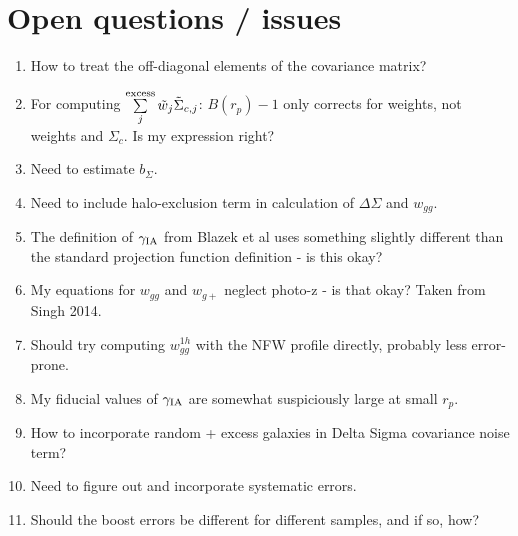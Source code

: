 \documentclass[onecolumn,amsmath,aps,fleqn, superscriptaddress]{revtex4}
\begin{document}
\section{Open questions / issues}
\begin{enumerate}
\item{How to treat the off-diagonal elements of the covariance matrix?}
\item{For computing $\sum\limits_{j}^{\rm excess} \tilde{w}_j \tilde{\Sigma}_{c,j}$: $B(r_p) - 1$ only corrects for weights, not weights and $\Sigma_c$. Is my expression right?}
\item{Need to estimate $b_{\Sigma}$.}
\item{Need to include halo-exclusion term in calculation of $\Delta \Sigma$ and $w_{gg}$.}
\item{The definition of $\gamma_{\rm IA}$ from Blazek et al uses something slightly different than the standard projection function definition - is this okay?}
\item{My equations for $w_{gg}$ and $w_{g+}$ neglect photo-z - is that okay? Taken from Singh 2014.}
\item{Should try computing $w_{gg}^{1h}$ with the NFW profile directly, probably less error-prone.}
\item{My fiducial values of $\gamma_{\rm IA}$ are somewhat suspiciously large at small $r_p$.}
\item{How to incorporate random + excess galaxies in Delta Sigma covariance noise term?}
\item{Need to figure out and incorporate systematic errors.}
\item{Should the boost errors be different for different samples, and if so, how?}
\end{enumerate}











\end{document}
